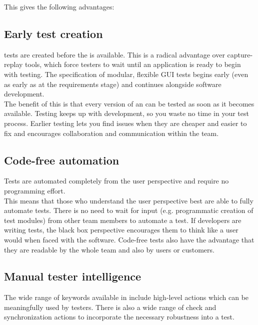 This gives the following advantages: 

\subsection{Early test creation}

\jb{} tests are created before the \gdaut{} is available. This is a radical advantage over capture-replay tools, which force testers to wait until an application is ready to begin with testing. The specification of modular, flexible GUI tests begins early (even as early as at the requirements stage) and continues alongside software development.\\ 
The benefit of this is that every version of an \gdaut{} can be tested as soon as it becomes available. Testing keeps up with development, so you waste no time in your test process. Earlier testing lets you find issues when they are cheaper and easier to fix and encourages collaboration and communication within the team.

\subsection{Code-free automation}

Tests are automated completely from the user perspective and require no programming effort. \\

This means that those who understand the user perspective best are able to fully automate tests. There is no need to wait for input (e.g. programmatic creation of test modules) from other team members to automate a test. If developers are writing tests, the black box perspective encourages them to think like a user would when faced with the software. Code-free tests also have the advantage that they are readable by the whole team and also by users or customers. 


\subsection{Manual tester intelligence}

The wide range of keywords available in \jb{} include high-level actions which can be meaningfully used by testers. There is also a wide range of check and synchronization actions to incorporate the necessary robustness into a test. 

